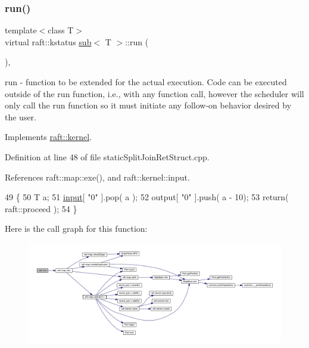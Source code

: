 \subsubsection{\texorpdfstring{run()}{run()}\hspace{0.1cm}{\footnotesize\ttfamily [5/12]}}
{\footnotesize\ttfamily template$<$class T$>$ \\
virtual raft\+::kstatus \hyperlink{classsub}{sub}$<$ T $>$\+::run (\begin{DoxyParamCaption}{ }\end{DoxyParamCaption})\hspace{0.3cm}{\ttfamily [inline]}, {\ttfamily [virtual]}}

run -\/ function to be extended for the actual execution. Code can be executed outside of the run function, i.\+e., with any function call, however the scheduler will only call the run function so it must initiate any follow-\/on behavior desired by the user. 

Implements \hyperlink{classraft_1_1kernel_a05094286d7577360fb1b91c91fc05901}{raft\+::kernel}.



Definition at line 48 of file static\+Split\+Join\+Ret\+Struct.\+cpp.



References raft\+::map\+::exe(), and raft\+::kernel\+::input.


\begin{DoxyCode}
49     \{
50         T a;
51         \hyperlink{classraft_1_1kernel_a6edbe35a56409d402e719b3ac36d6554}{input}[ \textcolor{stringliteral}{"0"} ].pop( a );
52         output[ \textcolor{stringliteral}{"0"} ].push( a - 10);
53         \textcolor{keywordflow}{return}( raft::proceed );
54     \}
\end{DoxyCode}
Here is the call graph for this function\+:
\nopagebreak
\begin{figure}[H]
\begin{center}
\leavevmode
\includegraphics[width=350pt]{classsub_a0a0c7461433ee8b5f4b24305282bf69a_cgraph}
\end{center}
\end{figure}
\hypertarget{classsub_a0a0c7461433ee8b5f4b24305282bf69a}{}\label{classsub_a0a0c7461433ee8b5f4b24305282bf69a} 
